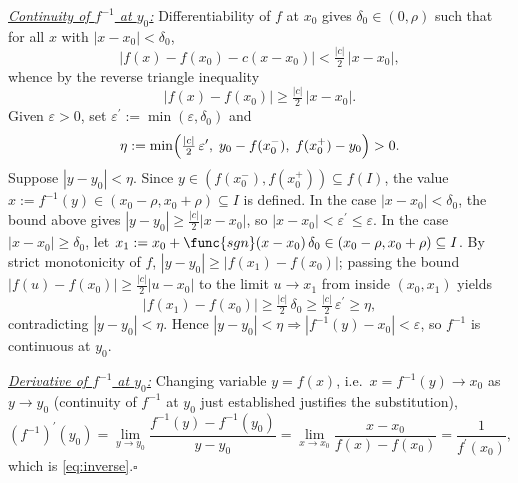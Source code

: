 \documentclass[11pt,reqno]{amsart}
\makeatletter
\theoremstyle{redplain}
\renewenvironment{proof}[1][Proof]{\noindent\textbf{#1.}\ }{\ }
\renewenvironment{proof}[1][\proofname]{	\proof@ORIG[#1]\mbox{}\par\nobreak
}{	\endproof@ORIG
}
\makeatother
\begin{document}
\begin{proof}[Proof of \autoref{thm:inverse}]
\underline{\emph{Continuity of $f^{-1}$ at $y_0$:}}\newline
Differentiability of $f$ at $x_0$ gives $\delta_0\in(0,\rho)$ such that for
all $x$ with $|x-x_0|<\delta_0$, 
\begin{equation*}
|f(x)-f(x_0)-c(x-x_0)|<\tfrac{|c|}{2}\,|x-x_0|,
\end{equation*}
whence by the reverse triangle inequality 
\begin{equation*}
|f(x)-f(x_0)|\ge\tfrac{|c|}{2}\,|x-x_0|.
\end{equation*}
Given $\varepsilon>0$, set $\varepsilon^{\prime
}:=\min(\varepsilon,\delta_0) $ and 
\begin{equation*}
\eta:=\min\Bigl(\tfrac{|c|}{2}\,\varepsilon^{\prime },\; y_0-f(x_0^{-}),\;
f(x_0^{+})-y_0\Bigr)>0.
\end{equation*}
Suppose $|y-y_0|<\eta$.\newline
Since $y\in(f(x_0^{-}),f(x_0^{+}))\subseteq f(I)$, the value $%
x:=f^{-1}(y)\in(x_0-\rho,x_0+\rho)\subseteq I$ is defined. In the case $%
|x-x_0|<\delta_0$, the bound above gives $|y-y_0|\ge\tfrac{|c|}{2}|x-x_0|$,
so $|x-x_0|<\varepsilon^{\prime }\le\varepsilon$. In the case $%
|x-x_0|\ge\delta_0$, let $x_1:=x_0+\func{sgn}(x-x_0)\,\delta_0\in(x_0-%
\rho,x_0+\rho)\subseteq I$.\newline
By strict monotonicity of $f$, $|y-y_0|\ge|f(x_1)-f(x_0)|$;\newline
passing the bound $|f(u)-f(x_0)|\ge\tfrac{|c|}{2}|u-x_0|$ to the limit $u\to
x_1$ from inside $(x_0,x_1)$ yields 
\begin{equation*}
|f(x_1)-f(x_0)|\ge\tfrac{|c|}{2}\,\delta_0 \ge\tfrac{|c|}{2}%
\,\varepsilon^{\prime } \ge\eta,
\end{equation*}
contradicting $|y-y_0|<\eta$. Hence $|y-y_0|<\eta\Rightarrow|f^{-1}(y)-x_0|<%
\varepsilon$, so $f^{-1}$ is continuous at $y_0$.

\underline{\emph{Derivative of $f^{-1}$ at $y_0$:}}\newline
Changing variable $y=f(x)$, i.e.\ $x=f^{-1}(y)\to x_0$ as $y\to y_0$
(continuity of $f^{-1}$ at $y_0$ just established justifies the
substitution), 
\begin{equation*}
(f^{-1})^{\prime }(y_0) =\lim_{y\to y_0}\frac{f^{-1}(y)-f^{-1}(y_0)}{y-y_0}
=\lim_{x\to x_0}\frac{x-x_0}{f(x)-f(x_0)} =\frac{1}{f^{\prime }(x_0)},
\end{equation*}
which is \autoref{eq:inverse}.\hfill$\square$
\end{proof}
\end{document}
